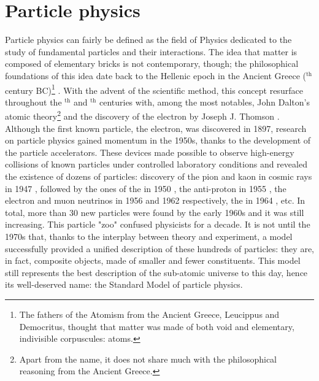 
\chapter{Particle physics}
\label{chap:ParticlePhysics}

Particle physics can fairly be defined as the field of Physics dedicated to the study of fundamental particles and their interactions. The idea that matter is composed of elementary bricks is not contemporary, though; the philosophical foundations of this idea date back to the Hellenic epoch in the Ancient Greece ($^{\text{th}}$ century BC)\footnote{The fathers of the Atomism from the Ancient Greece, Leucippus and Democritus, thought that matter was made of both void and elementary, indivisible corpuscules: atoms.} \cite{pullmanAtomHistoryHuman1998}. With the advent of the scientific method, this concept resurface throughout the $^{\text{th}}$ and $^{\text{th}}$ centuries with, among the most notables, John Dalton's atomic theory\footnote{Apart from the name, it does not share much with the philosophical reasoning from the Ancient Greece.} and the discovery of the electron by Joseph J. Thomson \cite{thomsonXLCathodeRays1897}. Although the first known particle, the electron, was discovered in 1897, research on particle physics gained momentum in the 1950s, thanks to the development of the particle accelerators. These devices made possible to observe high-energy collisions of known particles under controlled laboratory conditions and revealed the existence of dozens of particles: discovery of the pion \cite{lattesProcessesInvolvingCharged1947} and kaon in cosmic rays in 1947 \cite{rochesterdr.EvidenceExistenceNew1947}, followed by the ones of the \rmLambda in 1950 \cite{hopperEvidenceConcerningExistence1950}, the anti-proton in 1955 \cite{chamberlainObservationAntiprotons1955}, the electron and muon neutrinos in 1956 \cite{reinesNeutrino1956} and 1962 \cite{danbyObservationHighEnergyNeutrino1962} respectively, the \rmXi in 1964 \cite{barnesObservationHyperonStrangeness1964a}, etc. In total, more than 30 new particles were found by the early 1960s \cite{serwayModernPhysics2004} and it was still increasing. This particle "zoo" confused physicists for a decade. It is not until the 1970s that, thanks to the interplay between theory and experiment, a model successfully provided a unified description of these hundreds of particles: they are, in fact, composite objects, made of smaller and fewer constituents. This model still represents the best description of the sub-atomic universe to this day, hence its well-deserved name: the Standard Model of particle physics. \\

